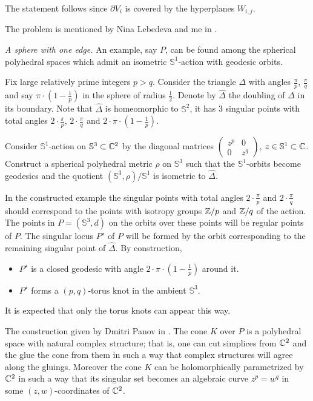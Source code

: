 The statement follows since $\partial V_i$ is covered by the hyperplanes $W_{i,j}$.

The problem is mentioned by Nina Lebedeva and me in \cite{lebedeva-petrunin}.

\textit{A sphere with one edge.}
An example, say $P$, can be found among the spherical polyhedral spaces which admit
an isometric $\mathbb{S}^1$-action with geodesic orbits.

Fix large relatively prime integers $p>q$. 
Consider the triangle $\Delta$ with angles $\tfrac\pi p$, $\tfrac\pi q$ and say $\pi\cdot(1-\tfrac1 p)$ in the sphere of radius $\tfrac12$.
Denote by $\hat \Delta$ the  doubling of $\Delta$ in its boundary.
Note that $\hat \Delta$ is homeomorphic to $\mathbb S^2$,
it has 3 singular points with total angles $2\cdot\tfrac\pi p$,
$2\cdot\tfrac\pi q$ and $2\cdot\pi\cdot(1-\tfrac1 p)$.

Consider $\mathbb S^1$-action on $\mathbb S^3\subset\mathbb{C}^2$ by the diagonal matrices $\left(\begin{smallmatrix}z^p&0\\0&z^q\end{smallmatrix}\right)$, $z\in\mathbb S^1\subset\mathbb{C}$.
Construct a spherical polyhedral metric $\rho$ on  $\mathbb S^3$
such that the $\mathbb S^1$-orbits become geodesics 
and the quotient $(\mathbb S^3,\rho)/\mathbb S^1$
is isometric to $\hat \Delta$.

In the constructed example 
the singular points with total angles $2\cdot\tfrac\pi p$ and
$2\cdot\tfrac\pi q$
should correspond to the points with isotropy groups $\mathbb{Z}/p$ and $\mathbb{Z}/q$ of the action.
The points in $P=(\mathbb{S}^3,d)$ on the orbits over these points will be regular points of $P$.
The singular locus $P^\star$
of $P$ will be formed by the orbit corresponding to the remaining singular point of  $\hat \Delta$.
By construction,
\begin{itemize}
\item $P^\star$ is a closed geodesic with angle $2\cdot\pi\cdot(1-\tfrac1p)$ around it.
\item $P^\star$ forms a $(p,q)$-torus knot in the ambient $\mathbb{S}^3$.
\end{itemize}


It is expected that only the torus knots can appear this way.

The construction given by Dmitri Panov in \cite{panov-Kaeler}.
The cone $K$ over $P$ is a polyhedral space with natural complex structure;
that is, one can cut simplices from $\mathbb{C}^2$ and the glue the cone from them in such a way that complex structures will agree along the gluings.
Moreover the cone $K$ can be holomorphically parametrized by $\mathbb{C}^2$ in such a way that its singular set becomes an algebraic curve $z^p=w^q$ in some $(z,w)$-coordinates of $\mathbb{C}^2$.



